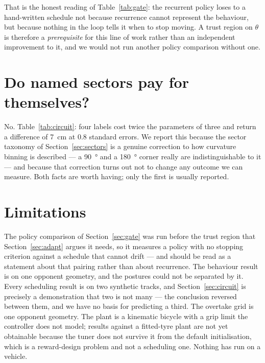 \documentclass[letterpaper, 10 pt, conference]{ieeeconf}
\begin{document}
That is the honest reading of Table~\ref{tab:gate}: the recurrent policy loses
to a hand-written schedule not because recurrence cannot represent the
behaviour, but because nothing in the loop tells it when to stop moving. A
trust region on $\theta$ is therefore a \emph{prerequisite} for this line of
work rather than an independent improvement to it, and we would not run another
policy comparison without one.

\section{Do named sectors pay for themselves?}
No. Table~\ref{tab:circuit}: four labels cost twice the parameters of three and
return a difference of \SI{7}{\centi\meter} at $0.8$ standard errors. We report
this because the sector taxonomy of Section~\ref{sec:sectors} is a genuine
correction to how curvature binning is described --- a \SI{90}{\degree} and a
\SI{180}{\degree} corner really are indistinguishable to it --- and because that
correction turns out not to change any outcome we can measure. Both facts are
worth having; only the first is usually reported.

\section{Limitations}
The policy comparison of Section~\ref{sec:gate} was run before the trust region
that Section~\ref{sec:adapt} argues it needs, so it measures a policy with no
stopping criterion against a schedule that cannot drift --- and should be read
as a statement about that pairing rather than about recurrence. The behaviour
result is on one opponent geometry, and the postures could not be separated by
it. Every scheduling result is on two synthetic tracks, and
Section~\ref{sec:circuit} is precisely a demonstration that two is not many --- the conclusion reversed between them, and
we have no basis for predicting a third. The overtake grid is one opponent
geometry. The plant is a kinematic bicycle
with a grip limit the controller does not model; results against a fitted-tyre
plant are not yet obtainable because the tuner does not survive it from the
default initialisation, which is a reward-design problem and not a scheduling
one. Nothing has run on a vehicle.



\end{document}
